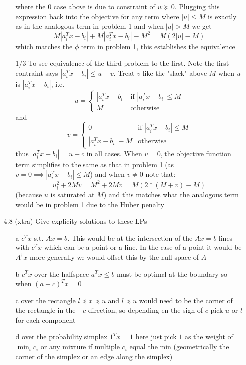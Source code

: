 \documentclass[12pt]{article}
\begin{document}
\begin{itemize}
\begin{itemize}
  where the $0$ case above is due to constraint of $w \succeq 0$. Plugging this expression back into the objective for any term where $|u| \leq M$ is exactly as in the analogous term in problem 1
  and when $|u| > M$ we get
  $$M |a_i^Tx - b_i| + M|a_i^Tx - b_i| - M^2 = M(2|u| - M)$$
  which matches the $\phi$ term in problem 1, this establishes the equivalence
\item[1/3]
  To see equivalence of the third problem to the first. Note the first contraint says $|a_i^Tx - b_i| \leq u+v$. Treat $v$ like the "slack" above $M$ when $u$ is $|a_i^Tx - b_i|$, i.e.
  $$u = \begin{cases}
    |a_i^Tx - b_i| & \text{if } |a_i^Tx - b_i| \leq M \\
    M & \text{otherwise}
  \end{cases}
  $$
  and
  $$
  v = \begin{cases}
    0 & \text{if } |a_i^Tx - b_i| \leq M \\
    |a_i^Tx - b_i| - M & \text{otherwise}
  \end{cases}
  $$
  thus $|a_i^Tx - b_i| = u + v$ in all cases. When $v = 0$, the objective function term simplifies to the same as that in problem 1 (as $v = 0 \implies |a_i^Tx - b_i| \leq M$) and when $v \neq 0$ note that:
  $$u_i^2 + 2Mv = M^2 + 2Mv = M(2*(M+v) - M)$$
  (because $u$ is saturated at $M$)
  and this matches what the analogous term would be in problem 1 due to the Huber penalty
\end{itemize}

\item[4.8 (xtra)] Give explicity solutions to these LPs
  \begin{itemize}
  \item[a] $c^Tx$ s.t. $Ax = b$. This would be at the intersection of the $Ax = b$ lines with $c^Tx$ which can be a point or a line. In the case of a point it would be $A^\dagger x$ more generally we would offset this by the null space of $A$
  \item[b] $c^Tx$ over the halfspace $a^Tx \leq b$ must be optimal at the boundary so when $(a-c)^T x = 0$
  \item[c] over the rectangle $l \preceq x \preceq u$ and $l \preceq u$ would need to be the corner of the rectangle in the $-c$ direction, so depending on the sign of $c$ pick $u$ or $l$ for each component
  \item[d] over the probability simplex $1^T x = 1$ here just pick $1$ as the weight of $\min_i c_i$ or any mixture if multiple $c_i$ equal the min (geometrically the corner of the simplex or an edge along the simplex)
  \end{itemize}

  
\end{itemize}
\end{document}
